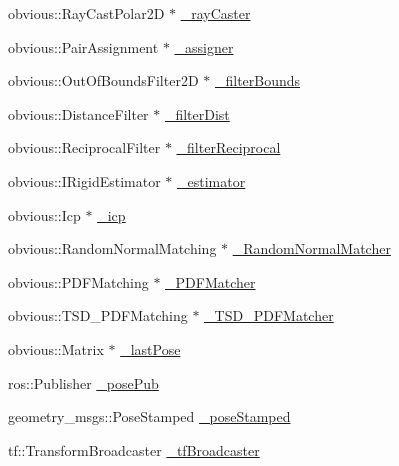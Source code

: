 \begin{DoxyCompactItemize}
\item 
obvious\-::\-Ray\-Cast\-Polar2\-D $\ast$ \hyperlink{classohm__tsd__slam__ref_1_1ThreadLocalize_acf45081cf4d42221dbc924b9fd6a1384}{\-\_\-ray\-Caster}
\item 
obvious\-::\-Pair\-Assignment $\ast$ \hyperlink{classohm__tsd__slam__ref_1_1ThreadLocalize_a45c7b109a3a9f22e0c60111c58eb0dd3}{\-\_\-assigner}
\item 
obvious\-::\-Out\-Of\-Bounds\-Filter2\-D $\ast$ \hyperlink{classohm__tsd__slam__ref_1_1ThreadLocalize_aac86a10eecf70da80d5198e9296e2aea}{\-\_\-filter\-Bounds}
\item 
obvious\-::\-Distance\-Filter $\ast$ \hyperlink{classohm__tsd__slam__ref_1_1ThreadLocalize_a34e17bd9ddbcf1431feb2cca272d8d69}{\-\_\-filter\-Dist}
\item 
obvious\-::\-Reciprocal\-Filter $\ast$ \hyperlink{classohm__tsd__slam__ref_1_1ThreadLocalize_a4444f42e17414907a35919adc4904268}{\-\_\-filter\-Reciprocal}
\item 
obvious\-::\-I\-Rigid\-Estimator $\ast$ \hyperlink{classohm__tsd__slam__ref_1_1ThreadLocalize_a34dc7fcb1cc798542270309014f09b93}{\-\_\-estimator}
\item 
obvious\-::\-Icp $\ast$ \hyperlink{classohm__tsd__slam__ref_1_1ThreadLocalize_a03e76d4fd6e599eb2e508dde1553c278}{\-\_\-icp}
\item 
obvious\-::\-Random\-Normal\-Matching $\ast$ \hyperlink{classohm__tsd__slam__ref_1_1ThreadLocalize_a527f8668ebe51a6bc7cadba7075c8c3f}{\-\_\-\-Random\-Normal\-Matcher}
\item 
obvious\-::\-P\-D\-F\-Matching $\ast$ \hyperlink{classohm__tsd__slam__ref_1_1ThreadLocalize_ad9d5e74c4f7b20dcb89e108ad8cfbe08}{\-\_\-\-P\-D\-F\-Matcher}
\item 
obvious\-::\-T\-S\-D\-\_\-\-P\-D\-F\-Matching $\ast$ \hyperlink{classohm__tsd__slam__ref_1_1ThreadLocalize_a8c7ca5e711fc2a346d130c9074b4f14d}{\-\_\-\-T\-S\-D\-\_\-\-P\-D\-F\-Matcher}
\item 
obvious\-::\-Matrix $\ast$ \hyperlink{classohm__tsd__slam__ref_1_1ThreadLocalize_a9b1c9b9fbbf202c5532755553cb42964}{\-\_\-last\-Pose}
\item 
ros\-::\-Publisher \hyperlink{classohm__tsd__slam__ref_1_1ThreadLocalize_a4072511df787f573ce74945a3021cd70}{\-\_\-pose\-Pub}
\item 
geometry\-\_\-msgs\-::\-Pose\-Stamped \hyperlink{classohm__tsd__slam__ref_1_1ThreadLocalize_a53b8418b5cb138095c170ee523c5e433}{\-\_\-pose\-Stamped}
\item 
tf\-::\-Transform\-Broadcaster \hyperlink{classohm__tsd__slam__ref_1_1ThreadLocalize_a422982c64baaa0ea6b2e259c78bb14f8}{\-\_\-tf\-Broadcaster}

\end{DoxyCompactItemize}
